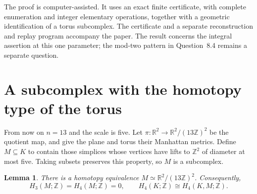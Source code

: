 \documentclass[11pt]{amsart}
\newtheorem{lemma}[theorem]{Lemma}
\newcommand{\Z}{\mathbb Z}
\begin{document}
The proof is computer-assisted. It uses an exact finite certificate, with
complete enumeration and integer elementary operations, together with a
geometric identification of a torus subcomplex. The certificate and a
separate reconstruction and replay program accompany the paper. The result
concerns the integral assertion at this one parameter; the mod-two pattern
in Question~8.4 remains a separate question.

\section{A subcomplex with the homotopy type of the torus}
From now on $n=13$ and the scale is five. Let
$\pi:\mathbb R^2\to\mathbb R^2/(13\Z)^2$ be the quotient map, and give
the plane and torus their Manhattan metrics. Define $M\subseteq K$ to
contain those simplices whose vertices have lifts to $\Z^2$ of diameter
at most five. Taking subsets preserves this property, so $M$ is a
subcomplex.

\begin{lemma}\label{lem:core}
There is a homotopy equivalence $M\simeq\mathbb R^2/(13\Z)^2$.
Consequently,
\[
 H_3(M;\Z)=H_4(M;\Z)=0,
 \qquad H_4(K;\Z)\cong H_4(K,M;\Z).
\]
\end{lemma}
\end{document}
